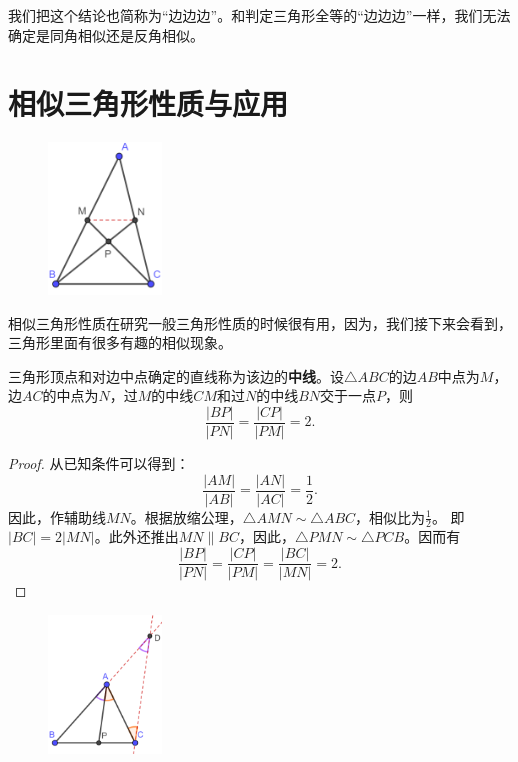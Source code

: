 \documentclass[12pt,UTF8]{ctexbook}
\begin{document}
我们把这个结论也简称为“边边边”。和判定三角形全等的“边边边”一样，我们无法确定是同角相似还是反角相似。

\section{相似三角形性质与应用}

\begin{figure} %
    \vspace{-10pt}
    \includegraphics[width=0.27\textwidth]{tu/三角形8.png}
\end{figure}

相似三角形性质在研究一般三角形性质的时候很有用，因为，我们接下来会看到，三角形里面有很多有趣的相似现象。

\begin{tm}\label{tm:0-2-0}
    三角形顶点和对边中点确定的直线称为该边的\textbf{中线}。设$\triangle ABC$的边$AB$中点为$M$，
    边$AC$的中点为$N$，过$M$的中线$CM$和过$N$的中线$BN$交于一点$P$，则
    $$\frac{|BP|}{|PN|} = \frac{|CP|}{|PM|} = 2.$$
\end{tm}
\begin{proof}
    从已知条件可以得到：
    $$\frac{|AM|}{|AB|} = \frac{|AN|}{|AC|} = \frac12.$$
    因此，作辅助线$MN$。根据放缩公理，$\triangle AMN \sim \triangle ABC$，相似比为$\frac12$。
    即$|BC| = 2|MN|$。此外还推出$MN \parallel BC$，因此，$\triangle PMN \sim \triangle PCB$。因而有
    $$\frac{|BP|}{|PN|} = \frac{|CP|}{|PM|} = \frac{|BC|}{|MN|} = 2.$$
\end{proof}

\begin{figure} %
    \vspace{-10pt}
    \includegraphics[width=0.27\textwidth]{tu/三角形9.png}
\end{figure}
\end{document}
